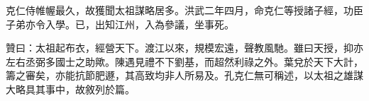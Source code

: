 \begin{pinyinscope}
克仁侍帷幄最久，故獲聞太祖謀略居多。洪武二年四月，命克仁等授諸子經，功臣子弟亦令入學。已，出知江州，入為參議，坐事死。

贊曰：太祖起布衣，經營天下。渡江以來，規模宏遠，聲教風馳。雖曰天授，抑亦左右丞弼多國士之助歟。陳遇見禮不下劉基，而超然利祿之外。葉兌於天下大計，籌之審矣，亦能抗節肥遯，其高致均非人所易及。孔克仁無可稱述，以太祖之雄謀大略具其事中，故敘列於篇。


\end{pinyinscope}